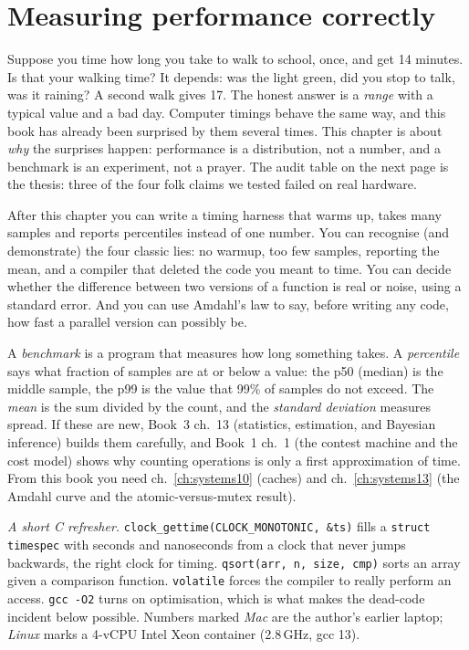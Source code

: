 \chapter{Measuring performance correctly}
\label{ch:systems15}

Suppose you time how long you take to walk to school, once, and
get 14 minutes. Is that your walking time? It depends: was the light
green, did you stop to talk, was it raining? A second walk gives 17.
The honest answer is a \emph{range} with a typical value and a bad
day. Computer timings behave the same way, and this book has already
been surprised by them several times. This chapter is about \emph{why}
the surprises happen: performance is a distribution, not a number, and
a benchmark is an experiment, not a prayer. The audit table on the
next page is the thesis: three of the four folk claims we tested
failed on real hardware.

\begin{wins}
After this chapter you can write a timing harness that warms up,
takes many samples and reports percentiles instead of one number. You
can recognise (and demonstrate) the four classic lies: no warmup, too
few samples, reporting the mean, and a compiler that deleted the code
you meant to time. You can decide whether the difference between two
versions of a function is real or noise, using a standard error. And
you can use Amdahl's law to say, before writing any code, how fast a
parallel version can possibly be.
\end{wins}

\begin{rulebox}
A \emph{benchmark} is a program that measures how long something
takes. A \emph{percentile} says what fraction of samples are at or
below a value: the p50 (median) is the middle sample, the p99 is the
value that 99\% of samples do not exceed. The \emph{mean} is the sum
divided by the count, and the \emph{standard deviation} measures
spread. If these are new, Book~3 ch.~13 (statistics, estimation, and
Bayesian inference) builds them carefully, and Book~1 ch.~1 (the
contest machine and the cost model) shows why counting operations is
only a first approximation of time. From this book you need
ch.~\ref{ch:systems10} (caches) and ch.~\ref{ch:systems13} (the
Amdahl curve and the atomic-versus-mutex result).

\emph{A short C refresher.} \texttt{clock\_gettime(CLOCK\_MONOTONIC,
\&ts)} fills a \texttt{struct timespec} with seconds and nanoseconds
from a clock that never jumps backwards, the right clock for timing.
\texttt{qsort(arr, n, size, cmp)} sorts an array given a comparison
function. \texttt{volatile} forces the compiler to really perform an
access. \texttt{gcc -O2} turns on optimisation, which is what makes the
dead-code incident below possible. Numbers marked \emph{Mac} are the
author's earlier laptop; \emph{Linux} marks a 4-vCPU Intel Xeon
container (2.8\,GHz, gcc 13).
\end{rulebox}

